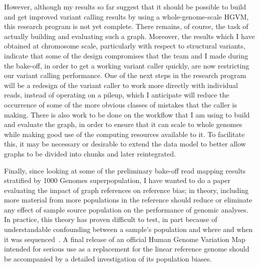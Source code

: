 However, although my results so far suggest that it should be possible to build and get improved variant calling results by using a whole-genome-scale HGVM, this research program is not yet complete. There remains, of course, the task of actually building and evaluating such a graph. Moreover, the results which I have obtained at chromosome scale, particularly with respect to structural variants, indicate that some of the design compromises that the team and I made during the bake-off, in order to get a working \vg variant caller quickly, are now restricting our variant calling performance. One of the next steps in the research program will be a redesign of the variant caller to work more directly with individual reads, instead of operating on a pileup, which I anticipate will reduce the occurrence of some of the more obvious classes of mistakes that the caller is making. There is also work to be done on the workflow that I am using to build and evaluate the graph, in order to ensure that it can scale to whole genomes while making good use of the computing resources available to it. To facilitate this, it may be necessary or desirable to extend the \vg data model to better allow graphs to be divided into chunks and later reintegrated.

Finally, since looking at some of the preliminary bake-off read mapping results stratified by 1000 Genomes superpopulation, I have wanted to do a paper evaluating the impact of graph references on reference bias; in theory, including more material from more populations in the reference should reduce or eliminate any effect of sample source population on the performance of genomic analyses. In practice, this theory has proven difficult to test, in part because of understandable confounding between a sample's population and where and when it was sequenced~\cite{novak2017genome}. A final release of an official Human Genome Variation Map intended for serious use as a replacement for the linear reference genome should be accompanied by a detailed investigation of its population biases.
    

